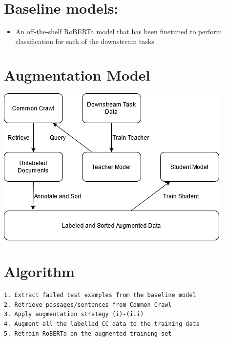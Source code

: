 \documentclass[11pt]{article}
\begin{document}
\section{Baseline models:}
\label{sec:org043eda7}
\begin{itemize}
\item An off-the-shelf RoBERTa model that has been finetuned to perform classification for each of the downstream tasks
\end{itemize}

\section{Augmentation Model}
\label{sec:orge7956d4}
\begin{center}
\includegraphics[width=.9\linewidth]{./png/da.png}
\end{center}


\section{Algorithm}
\label{sec:orgc8950b2}
\begin{verbatim}
1. Extract failed test examples from the baseline model
2. Retrieve passages/sentences from Common Crawl 
3. Apply augmentation strategy (i)-(iii)
4. Augment all the labelled CC data to the training data
5. Retrain RoBERTa on the augmented training set 
\end{verbatim}
\end{document}

